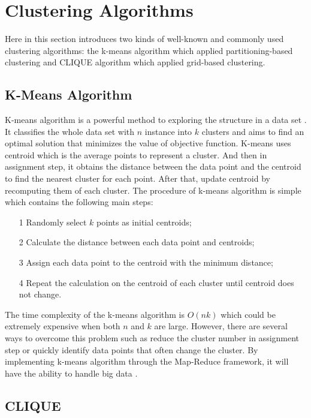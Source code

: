 \documentclass[sigconf]{acmart}
\begin{document}
\section{Clustering Algorithms}

Here in this section introduces two kinds of well-known and commonly used clustering algorithms: the k-means algorithm which applied partitioning-based clustering and CLIQUE algorithm which applied grid-based clustering.

\subsection{K-Means Algorithm}

K-means algorithm is a powerful method to exploring the structure in a data set \cite{bdca}. It classifies the whole data set with $n$ instance into $k$ clusters and aims to find an optimal solution that minimizes the value of objective function. K-means uses centroid which is the average points to represent a cluster. And then in assignment step, it obtains the distance between the data point and the centroid to find the nearest cluster for each point. After that, update centroid by recomputing them of each cluster. The procedure of k-means algorithm is simple which contains the following main steps:
\begin{itemize}
\item[1] Randomly select $k$ points as initial centroids;
\item[2] Calculate the distance between each data point and centroids;
\item[3] Assign each data point to the centroid with the minimum distance;
\item[4] Repeat the calculation on the centroid of each cluster until centroid does not change.
\end{itemize}

The time complexity of the k-means algorithm is $O(nk)$ which could be extremely expensive when both $n$ and $k$ are large. However, there are several ways to overcome this problem such as reduce the cluster number in assignment step or quickly identify data points that often change the cluster. By implementing k-means algorithm through the Map-Reduce framework, it will have the ability to handle big data \cite{bdca}.

\subsection{CLIQUE}
\end{document}
